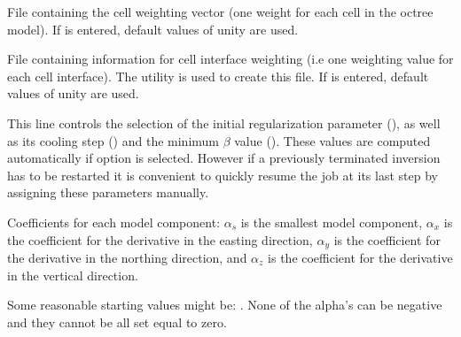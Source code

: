 \begin{description}[leftmargin=5cm, style=sameline, align=left]
\item[\fileName{cell weighting}] File containing the cell weighting vector (one weight for each cell in the octree model). If  is entered, default values of unity are used.
\item[\fileName{interface weighting}] File containing information for cell interface weighting (i.e one weighting value for each cell interface). The utility  is used to create this  file. If  is entered, default values of unity are used.      
\item[\codeName{beta}] This line controls the selection of the initial regularization parameter (), as well as its cooling step () and the minimum $\beta$ value (). These values are computed automatically if  option is selected. However if a previously terminated inversion has to be restarted it is convenient to quickly resume the job at its last step by assigning these parameters manually.
\item [\fileName{$\alpha_s, \alpha_x, \alpha_y, \alpha_z$}] Coefficients for each model component: $\alpha_s$ is the smallest model component, $\alpha_x$ is the coefficient for the derivative in the easting direction, $\alpha_y$ is the coefficient for the derivative in the northing direction, and $\alpha_z$ is the coefficient for the derivative in the vertical direction.

Some reasonable starting values might be: . None of the alpha's can be negative and they cannot be all set equal to zero.


\end{description}
